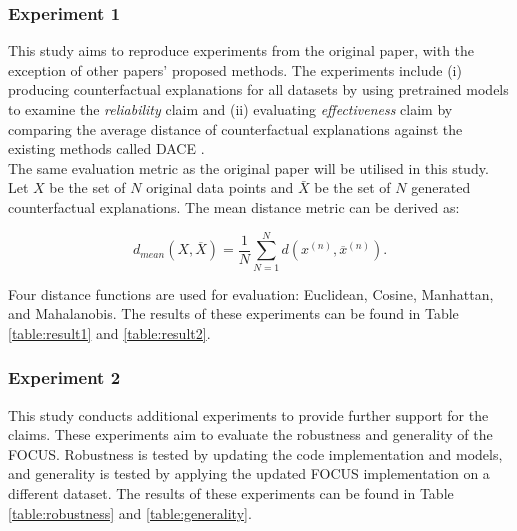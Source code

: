 \subsubsection{Experiment 1}
\label{sec:experiment1}
This study aims to reproduce experiments from the original paper, with the exception of other papers' proposed methods. The experiments include (i) producing counterfactual explanations for all datasets by using pretrained models to examine the \textit{reliability} claim and (ii) evaluating \textit{effectiveness} claim by comparing the average distance of counterfactual explanations against the existing methods called DACE \cite{kanamori2020dace}.\\
The same evaluation metric as the original paper will be utilised in this study. Let $X$ be the set of $N$ original data points and $\bar{X}$ be the set of $N$ generated counterfactual explanations. The mean distance metric can be derived as:

\begin{equation}
    d_{mean}(X, \overline{X}) = \frac{1}{N} \sum^{N}_{N=1} d(x^{(n)}, \overline{x}^{(n)}).
\end{equation}

Four distance functions are used for evaluation: Euclidean, Cosine, Manhattan, and Mahalanobis. The results of these experiments can be found in Table \ref{table:result1} and \ref{table:result2}.

\subsubsection{Experiment 2}
\label{sec:experiment2}
This study conducts additional experiments to provide further support for the claims. These experiments aim to evaluate the robustness and generality of the FOCUS. Robustness is tested by updating the code implementation and models, and generality is tested by applying the updated FOCUS implementation on a different dataset. The results of these experiments can be found in Table \ref{table:robustness} and \ref{table:generality}.


